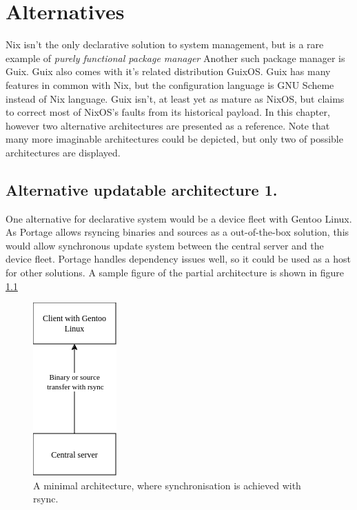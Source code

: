 \chapter{Alternatives} \label{alternatives}
Nix isn't the only declarative solution to system management, but is a rare example of \textit{purely functional package manager} Another such package manager is Guix. Guix also comes with it's related distribution GuixOS. Guix has many features in common with Nix, but the configuration language is GNU Scheme instead of Nix language. Guix isn't, at least yet as mature as NixOS, but claims to correct most of NixOS's faults from its historical payload. In this chapter, however two alternative architectures are presented as a reference. Note that many more imaginable architectures could be depicted, but only two of possible architectures are displayed. \cite{dolstra2010nixos} \cite{courtes2013functional}

\section{Alternative updatable architecture 1.}
One alternative for declarative system would be a device fleet with Gentoo Linux. As Portage allows rsyncing binaries and sources as a out-of-the-box solution, this would allow synchronous update system between the central server and the device fleet. Portage handles dependency issues well, so it could be used as a host for other solutions. A sample figure of the partial architecture is shown in figure \ref{gentooarchitecture} \cite{thiruvathukal2004gentoo}
\begin{figure}[H]
\centering
\includegraphics[scale=0.8]{latex/kuvat/gentooarchitecture.drawio.png}
\caption{A minimal architecture, where synchronisation is achieved with rsync.}
\label{gentooarchitecture}
\end{figure}

